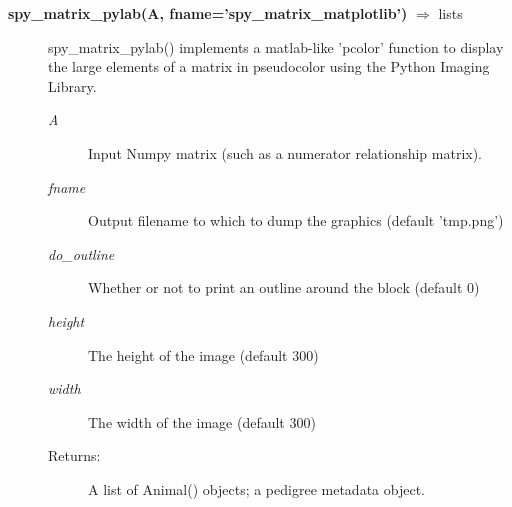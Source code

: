 \begin{description}
\item[\textbf{spy\_matrix\_pylab(A, fname='spy\_matrix\_matplotlib')} $\Rightarrow$ lists]
spy\_matrix\_pylab() implements a matlab-like 'pcolor' function to display the large elements of a matrix in pseudocolor using the Python Imaging Library.
\begin{description}
\item[\emph{A}] Input Numpy matrix (such as a numerator relationship matrix).
\item[\emph{fname}] Output filename to which to dump the graphics (default 'tmp.png')
\item[\emph{do\_outline}] Whether or not to print an outline around the block (default 0)
\item[\emph{height}] The height of the image (default 300)
\item[\emph{width}] The width of the image (default 300)
\item[Returns:] A list of Animal() objects; a pedigree metadata object.
\end{description}

\end{description}